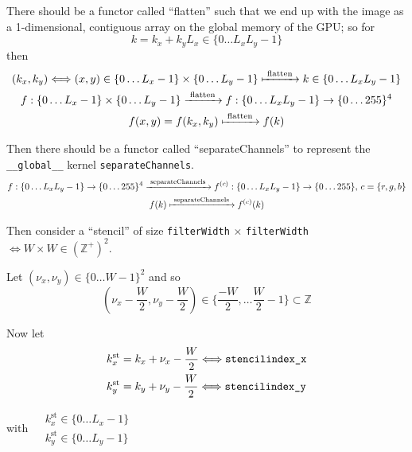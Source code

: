 \documentclass[10pt]{amsart}
\begin{document}
\begin{multicols*}{2}
There should be a functor called ``flatten'' such that we end up with the image as a 1-dimensional, contiguous array on the global memory of the GPU; so for
\[
k = k_x + k_y L_x \in \lbrace 0 \dots L_x L_y - 1 \rbrace
\]
then
\[
\begin{gathered}
  (k_x,k_y) \Longleftrightarrow (x,y) \in \lbrace 0 \dots L_x -1 \rbrace \times \lbrace 0 \dots L_y - 1 \rbrace \xmapsto{ \text{ flatten }} k \in \lbrace 0 \dots L_xL_y -1 \rbrace \\
  f:\lbrace 0 \dots L_x -1 \rbrace \times \lbrace 0 \dots L_y - 1 \rbrace \xrightarrow{ \text{ flatten }} f: \lbrace 0 \dots L_x L_y - 1 \rbrace \to \lbrace 0 \dots 255 \rbrace^4  \\
  f(x,y) = f(k_x,k_y) \xmapsto{ \text{ flatten } } f(k) 
\end{gathered}
\]

Then there should be a functor called ``separateChannels'' to represent the \verb|__global__| kernel \verb|separateChannels|.
\[
\begin{gathered}
  f: \lbrace 0 \dots L_x L_y - 1 \rbrace \to \lbrace 0 \dots 255 \rbrace^4 \xrightarrow{ \text{ separateChannels } } f^{(c)}:\lbrace 0 \dots L_xL_y -1 \rbrace \to \lbrace 0 \dots 255 \rbrace , \, c = \lbrace r,g,b \rbrace \\ 
 f(k) \xmapsto{ \text{ separateChannels } } f^{(c)}(k)
\end{gathered}
\]

Then consider a ``stencil'' of size \verb|filterWidth| $\times$ \verb|filterWidth| $\Longleftrightarrow W \times W \in (\mathbb{Z}^+)^2$.

Let $(\nu_x,\nu_y) \in \lbrace 0 \dots W-1 \rbrace^2$ and so
\[
\left( \nu_x - \frac{W}{2} , \nu_y - \frac{W}{2} \right) \in \lbrace \frac{-W}{2} , \dots \frac{W}{2} - 1 \rbrace \subset \mathbb{Z}
\]

Now let
\[
\begin{aligned}
  &  k_x^{\text{st}} = k_x  + \nu_x - \frac{W}{2} \Longleftrightarrow \verb|stencilindex_x| \\ 
  & k_y^{\text{st}} = k_y  + \nu_y - \frac{W}{2} \Longleftrightarrow \verb|stencilindex_y| 
\end{aligned}
\]
with $\begin{aligned} & \quad \\
 &  k_x^{\text{st}} \in \lbrace 0 \dots L_x -1 \rbrace \\ 
  &  k_y^{\text{st}} \in \lbrace 0 \dots L_y -1 \rbrace \\
  \end{aligned}$


\end{multicols*}
\end{document}

